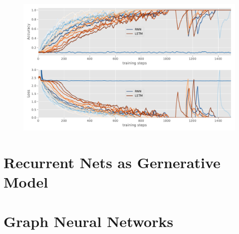 \documentclass{article}
\begin{document}
\begin{figure}\label{fig:accuracy_loss}
  \centering
  \includegraphics[width=\linewidth]{assignment_2/part1/palindrome.pdf}
  \caption{}
\end{figure}

\section{Recurrent Nets as Gernerative Model}
\subsection{}
\subsubsection{}
\subsubsection{}
\subsubsection{}
\subsection{}

\section{Graph Neural Networks}
\subsection{}
\subsubsection{}
\subsubsection{}
\subsection{}
\subsection{}
\subsubsection{}
\subsubsection{}
\end{document}
